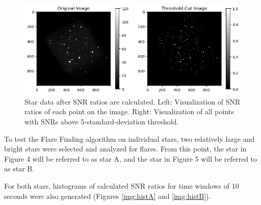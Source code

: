 \documentclass{article}
\begin{document}
\begin{figure}[h]
    \centering
    \includegraphics[width=\textwidth]{cut_snr_comparison.png}
    \caption{Star data after SNR ratios are calculated. Left: Visualization of SNR ratios of each point on the image. Right: Visualization of all points with SNRs above 5-standard-deviation threshold.}
    \label{img:imgSNR}
\end{figure}

\begin{multicols}{2}


To test the Flare Finding algorithm on individual stars, two relatively large and bright stars were selected and analyzed for flares. From this point, the star in Figure 4 will be referred to as star A, and the star in Figure 5 will be referred to as star B.

For both stars, histograms of calculated SNR ratios for time windows of 10 seconds were also generated (Figures \ref{img:histA} and \ref{img:histB}).

\end{multicols}
\end{document}
